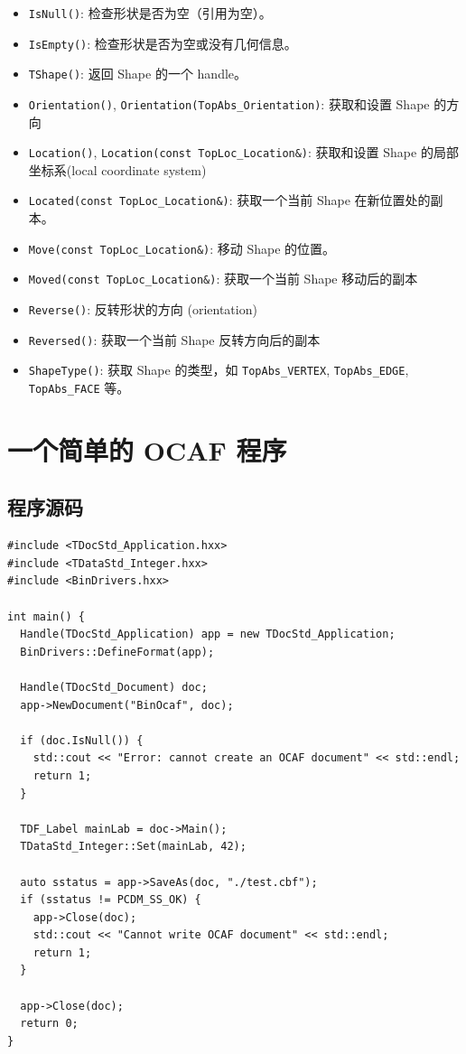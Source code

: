 \documentclass[11pt]{article}
\begin{document}
\begin{itemize}
\item \texttt{IsNull()}: 检查形状是否为空（引用为空）。
\item \texttt{IsEmpty()}: 检查形状是否为空或没有几何信息。
\item \texttt{TShape()}: 返回 Shape 的一个 handle。
\item \texttt{Orientation()}, \texttt{Orientation(TopAbs\_Orientation)}: 获取和设置 Shape 的方向
\item \texttt{Location()}, \texttt{Location(const TopLoc\_Location\&)}: 获取和设置 Shape 的局部坐标系(local coordinate system)
\item \texttt{Located(const TopLoc\_Location\&)}: 获取一个当前 Shape 在新位置处的副本。
\item \texttt{Move(const TopLoc\_Location\&)}: 移动 Shape 的位置。
\item \texttt{Moved(const TopLoc\_Location\&)}: 获取一个当前 Shape 移动后的副本
\item \texttt{Reverse()}: 反转形状的方向 (orientation)
\item \texttt{Reversed()}: 获取一个当前 Shape 反转方向后的副本
\item \texttt{ShapeType()}: 获取 Shape 的类型，如 \texttt{TopAbs\_VERTEX}, \texttt{TopAbs\_EDGE}, \texttt{TopAbs\_FACE} 等。
\end{itemize}
\section{一个简单的 OCAF 程序}
\label{sec:orgad26f40}

\subsection{程序源码}
\label{sec:orgf1cf85d}

\begin{verbatim}
#include <TDocStd_Application.hxx>
#include <TDataStd_Integer.hxx>
#include <BinDrivers.hxx>

int main() {
  Handle(TDocStd_Application) app = new TDocStd_Application;
  BinDrivers::DefineFormat(app);

  Handle(TDocStd_Document) doc;
  app->NewDocument("BinOcaf", doc);

  if (doc.IsNull()) {
    std::cout << "Error: cannot create an OCAF document" << std::endl;
    return 1;
  }

  TDF_Label mainLab = doc->Main();
  TDataStd_Integer::Set(mainLab, 42);

  auto sstatus = app->SaveAs(doc, "./test.cbf");
  if (sstatus != PCDM_SS_OK) {
    app->Close(doc);
    std::cout << "Cannot write OCAF document" << std::endl;
    return 1;
  }

  app->Close(doc);
  return 0;
}
\end{verbatim}
\end{document}

